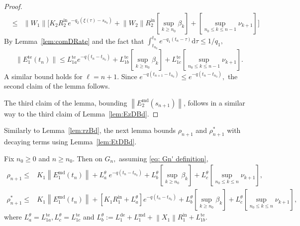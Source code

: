 \documentclass[usenames,dvipsnames,final,12pt]{colt2018} %
\newcommand{\Xt}{X_1}
\newcommand{\Wt}{W_1}
\newcommand{\lt}{q_1}
\newcommand{\Rti}{R_1^{\textrm{in}}}
\newcommand{\rt}{\rho}
\newcommand{\rtS}{\rho^{*}}
\newcommand{\Et}{E_1}
\newcommand{\Kt}{K_1}
\newcommand{\EtM}{\Et^{\md}}
\newcommand{\EtT}{\Et^{\te}}
\newcommand{\LtD}{L_1^{\dt}}
\newcommand{\LtM}{L_1^{\md}}
\newcommand{\LtT}[1]{L_{1 #1}^{\te}}
\newcommand{\Lt}[1]{L^{\theta}_{#1}}
\newcommand{\Ww}{W_2}
\newcommand{\lz}{q_2}
\newcommand{\Rzi}{R_2^{\textrm{in}}}
\newcommand{\rz}{\nu}
\newcommand{\Ez}{E_2}
\newcommand{\Kz}{K_2}
\newcommand{\EzM}{\Ez^{\md}}
\newcommand{\lm}{q}
\newcommand{\dt}{\text{de}}
\newcommand{\md}{\text{md}}
\newcommand{\te}{\text{te}}
\newcommand{\df}{\mathrm{d}}
\newcommand{\tI}[1]{t_{#1}}
\newcommand{\sI}[1]{s_{#1}}
\newcommand{\norm}[1]{\left\lVert#1\right\rVert}
\newcommand{\gal}[1]{#1}
\begin{document}
\begin{proof}
\begin{eqnarray*}
& \leq & \norm{\Wt}\Bigg[\Kz \Rzi e^{-\lz(\xi(\tau) - \sI{n_0})} + \norm{\Ww} \Rzi \left[\sup_{k \geq n_0} \beta_k\right] + \left[\sup_{n_0 \leq k \leq n - 1}\rz_{k + 1}\right]\Bigg]
\end{eqnarray*}
%
By Lemma~\ref{lem:comDRate} and the fact that $\int_{\tI{n_0}}^{\tI{n}} e^{-\lt(\tI{n} - \tau)} \df \tau \leq 1/\lt,$
%
\[
\|\EtT(\tI{n})\| \leq  \LtT{a} e^{-\lm(\tI{n} - \tI{n_0})} + \LtT{b}  \left[\sup_{k \geq n_0} \beta_k\right] + \LtT{c}\left[\sup_{n_0 \leq k \leq n - 1}\rz_{k + 1}\right].
\]
%
A similar bound holds for $\ell = n + 1.$ Since $e^{-\lm(\tI{n + 1} - \tI{n_0})} \leq e^{-\lm(\tI{n} - \tI{n_0})},$ the second claim of the lemma follows.

The third claim of the lemma, bounding $\norm{\EzM(\sI{n + 1})}$, follows in a similar way to the third claim of Lemma~\ref{lem:EzDBd}.
\end{proof}


Similarly to \gal{Lemma~\ref{lem:rzBd}}, the next lemma bounds $\rt_{n + 1}$ and $\rtS_{n + 1}$ with decaying terms using Lemma~\ref{lem:EtDBd}.

\begin{lemma}
\label{lem:rtBd}
Fix $n_0 \geq 0$ and $n \geq n_0.$ Then on $ G_n,$ \gal{assuming \eqref{eq: Gn' definition}},
%
\begin{align*}
\rt_{n + 1} \leq & \Kt \norm{\EtM(\tI{n})} + \Lt{a} \; e^{-q(\tI{n} - \tI{n_0})} + \Lt{b} \left[\sup_{k \geq n_0} \beta_k\right] + \Lt{c}\left[\sup_{n_0 \leq k \leq n} \nu_{k + 1}\right], \\
\rtS_{n + 1} \leq &\Kt \norm{\EtM(\tI{n})} + [\Kt \Rti + \Lt{a}] e^{- \lm (\tI{n} - \tI{n_0})} + \Lt{b} \left[\sup_{k \geq n_0} \beta_k\right] + \Lt{c}\left[\sup_{n_0 \leq k \leq n} \nu_{k + 1}\right],
\end{align*}
%
where $\Lt{a} = \LtT{a}, \Lt{c} = \LtT{c}$ and $\Lt{b} := \LtD + \LtM +  \norm{\Xt} \Rti + \LtT{b}$.

\end{lemma}
\end{document}
